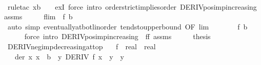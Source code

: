 \begin{isabellebody}
\ \ \ \ \isamarkupfalse%
\ {\isacharparenleft}{\kern0pt}rule{\isacharunderscore}{\kern0pt}tac\ x{\isacharequal}{\kern0pt}{\isachardoublequoteopen}b\ {\isacharminus}{\kern0pt}\ {}{\isachardoublequoteclose}\ \ exI{\isacharparenright}{\kern0pt}\ {\isacharparenleft}{\kern0pt}force\ intro{\isacharcolon}{\kern0pt}\ order{\isachardot}{\kern0pt}strict{\isacharunderscore}{\kern0pt}implies{\isacharunderscore}{\kern0pt}order\ DERIV{\isacharunderscore}{\kern0pt}pos{\isacharunderscore}{\kern0pt}imp{\isacharunderscore}{\kern0pt}increasing\ assms{\isacharparenright}{\kern0pt}\isanewline
\ \ \isamarkupfalse%
\ \isamarkupfalse%
\ {\isachardoublequoteopen}flim\ {\isasymle}\ f\ {\isacharparenleft}{\kern0pt}b\ {\isacharminus}{\kern0pt}\ {}{\isacharparenright}{\kern0pt}{\isachardoublequoteclose}\isanewline
\ \ \ \ \ \isamarkupfalse%
\ {\isacharparenleft}{\kern0pt}auto\ simp{\isacharcolon}{\kern0pt}\ eventually{\isacharunderscore}{\kern0pt}at{\isacharunderscore}{\kern0pt}bot{\isacharunderscore}{\kern0pt}linorder\ tendsto{\isacharunderscore}{\kern0pt}upperbound\ {\isacharbrackleft}{\kern0pt}OF\ lim{\isacharbrackright}{\kern0pt}{\isacharparenright}{\kern0pt}\isanewline
\ \ \isamarkupfalse%
\ \isamarkupfalse%
\ {\isachardoublequoteopen}{\isasymdots}\ {\isacharless}{\kern0pt}\ f\ b{\isachardoublequoteclose}\isanewline
\ \ \ \ \isamarkupfalse%
\ {\isacharparenleft}{\kern0pt}force\ intro{\isacharcolon}{\kern0pt}\ DERIV{\isacharunderscore}{\kern0pt}pos{\isacharunderscore}{\kern0pt}imp{\isacharunderscore}{\kern0pt}increasing\ {\isacharbrackleft}{\kern0pt}\ f{\isacharequal}{\kern0pt}f{\isacharbrackright}{\kern0pt}\ assms{\isacharparenright}{\kern0pt}\isanewline
\ \ \isamarkupfalse%
\ \isamarkupfalse%
\ {\isacharquery}{\kern0pt}thesis\ \isacommand{{\isachardot}{\kern0pt}}\isamarkupfalse%
\isanewline
{}\isamarkupfalse%
%
\endisatagproof
{\isafoldproof}%
%
\isadelimproof
\isanewline
%
\endisadelimproof
\isanewline
{}\isamarkupfalse%
\ DERIV{\isacharunderscore}{\kern0pt}neg{\isacharunderscore}{\kern0pt}imp{\isacharunderscore}{\kern0pt}decreasing{\isacharunderscore}{\kern0pt}at{\isacharunderscore}{\kern0pt}top{\isacharcolon}{\kern0pt}\isanewline
\ \ \ f\ {\isacharcolon}{\kern0pt}{\isacharcolon}{\kern0pt}\ {\isachardoublequoteopen}real\ {\isasymRightarrow}\ real{\isachardoublequoteclose}\isanewline
\ \ \ der{\isacharcolon}{\kern0pt}\ {\isachardoublequoteopen}{\isasymAnd}x{\isachardot}{\kern0pt}\ x\ {\isasymge}\ b\ {\isasymLongrightarrow}\ {\isasymexists}y{\isachardot}{\kern0pt}\ DERIV\ f\ x\ {\isacharcolon}{\kern0pt}{\isachargreater}{\kern0pt}\ y\ {\isasymand}\ y\ {\isacharless}{\kern0pt}\ {}{\isachardoublequoteclose}\isanewline

\end{isabellebody}
